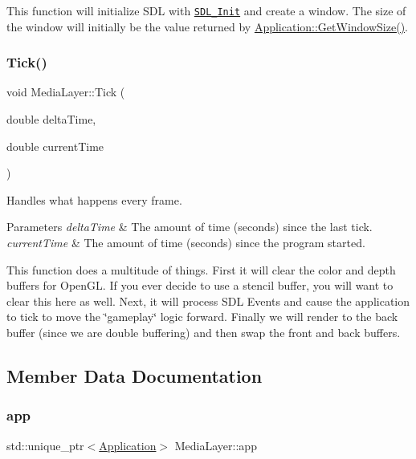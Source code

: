 This function will initialize S\+DL with \href{https://wiki.libsdl.org/SDL_Init}{\tt S\+D\+L\+\_\+\+Init} and create a window. The size of the window will initially be the value returned by \hyperlink{class_application_ab190ae0e987fe95682714dd4b2495e82}{Application\+::\+Get\+Window\+Size()}. \hypertarget{class_media_layer_a570ff8c3fc3e8f3e720d9dcebafba143}{}\label{class_media_layer_a570ff8c3fc3e8f3e720d9dcebafba143} 
\subsubsection{\texorpdfstring{Tick()}{Tick()}}
{\footnotesize\ttfamily void Media\+Layer\+::\+Tick (\begin{DoxyParamCaption}\item[{double}]{delta\+Time,  }\item[{double}]{current\+Time }\end{DoxyParamCaption})}



Handles what happens every frame. 


\begin{DoxyParams}{Parameters}
{\em delta\+Time} & The amount of time (seconds) since the last tick. \\
\hline
{\em current\+Time} & The amount of time (seconds) since the program started.\\
\hline
\end{DoxyParams}
This function does a multitude of things. First it will clear the color and depth buffers for Open\+GL. If you ever decide to use a stencil buffer, you will want to clear this here as well. Next, it will process S\+DL Events and cause the application to tick to move the \char`\"{}gameplay\char`\"{} logic forward. Finally we will render to the back buffer (since we are double buffering) and then swap the front and back buffers. 

\subsection{Member Data Documentation}
\hypertarget{class_media_layer_a3cddf8a24527db756c3fe0534fce4f0c}{}\label{class_media_layer_a3cddf8a24527db756c3fe0534fce4f0c} 
\subsubsection{\texorpdfstring{app}{app}}
{\footnotesize\ttfamily std\+::unique\+\_\+ptr$<$\hyperlink{class_application}{Application}$>$ Media\+Layer\+::app\hspace{0.3cm}{\ttfamily [private]}}



